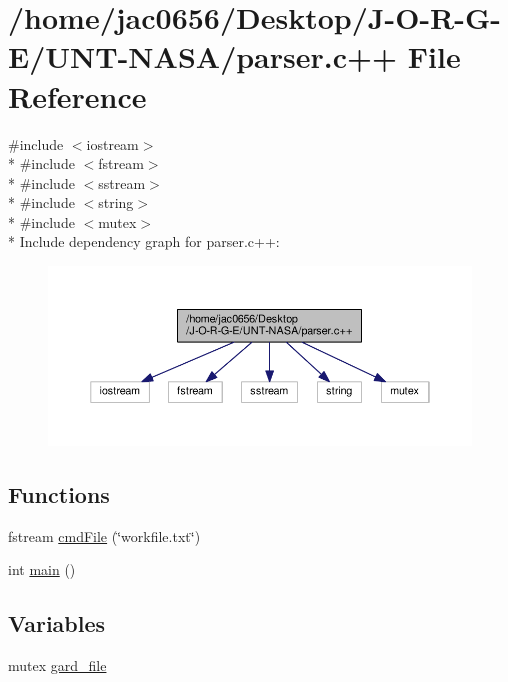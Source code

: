 \hypertarget{parser_8c_09_09}{}\section{/home/jac0656/\+Desktop/\+J-\/\+O-\/\+R-\/\+G-\/\+E/\+U\+N\+T-\/\+N\+A\+S\+A/parser.c++ File Reference}
\label{parser_8c_09_09}
{\ttfamily \#include $<$iostream$>$}\\*
{\ttfamily \#include $<$fstream$>$}\\*
{\ttfamily \#include $<$sstream$>$}\\*
{\ttfamily \#include $<$string$>$}\\*
{\ttfamily \#include $<$mutex$>$}\\*
Include dependency graph for parser.\+c++\+:\nopagebreak
\begin{figure}[H]
\begin{center}
\leavevmode
\includegraphics[width=350pt]{parser_8c_09_09__incl}
\end{center}
\end{figure}
\subsection*{Functions}
\begin{DoxyCompactItemize}
\item 
fstream \hyperlink{parser_8c_09_09_ae589633d918ad5abb5d09cf70fcf951f}{cmd\+File} (\char`\"{}workfile.\+txt\char`\"{})
\item 
int \hyperlink{parser_8c_09_09_ae66f6b31b5ad750f1fe042a706a4e3d4}{main} ()
\end{DoxyCompactItemize}
\subsection*{Variables}
\begin{DoxyCompactItemize}
\item 
mutex \hyperlink{parser_8c_09_09_af720f0c5d7682d27ea06535a0408f010}{gard\+\_\+file}
\end{DoxyCompactItemize}


